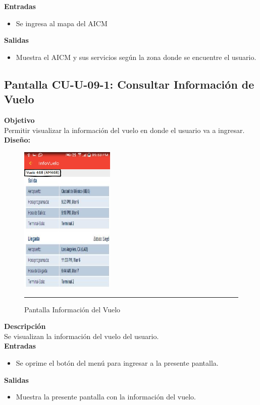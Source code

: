 \textbf{Entradas}
\begin{itemize}
\item Se ingresa al mapa del AICM
\end{itemize}

\textbf{Salidas}
\begin{itemize}
\item Muestra el AICM y sus servicios según la zona donde se encuentre el usuario.
\end{itemize}
\clearpage
\hypertarget{CU-U-09-1}{}
\subsection{Pantalla CU-U-09-1: Consultar Información de Vuelo}
\textbf{Objetivo}\\
Permitir visualizar la información del vuelo en donde el usuario va a ingresar. \\

\textbf{Diseño:}
\begin{figure}[h]
	\centering
		\includegraphics[width=0.4\textwidth]{Figuras/intInformacionVuelo.png}
		\rule{30em}{0.5pt}
	\caption[Pantalla Información del Vuelo]{Pantalla Información del Vuelo}
	\label{fig:intInformacionVuelo}
\end{figure}

\textbf{Descripción} \\
Se visualizan la información del vuelo del usuario. \\

\textbf{Entradas}
\begin{itemize}
\item Se oprime el botón del menú para ingresar a la presente pantalla.
\end{itemize}

\textbf{Salidas}
\begin{itemize}
\item Muestra la presente pantalla con la información del vuelo.
\end{itemize}